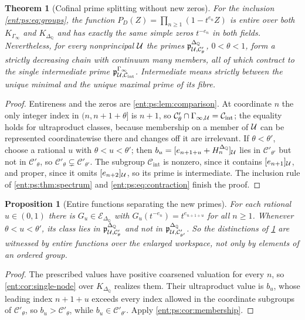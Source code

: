 \documentclass[11pt]{article}
\newtheorem{theorem}{Theorem}[section]
\theoremstyle{plain}
\theoremstyle{plain}
\newtheorem{proposition}[proposition]{Proposition}
\theoremstyle{plain}
\theoremstyle{definition}
\theoremstyle{definition}
\theoremstyle{definition}
\theoremstyle{definition}
\theoremstyle{remark}
\newcommand{\Q}{\mathbb Q}\newcommand{\Z}{\mathbb Z}\newcommand{\N}{\mathbb N}
\begin{document}
\begin{theorem}[Cofinal prime splitting without new zeros]
\label{ent:ps:thm:splitting}
For the inclusion \eqref{ent:ps:eq:groups}, the function
$P_D(Z)=\prod_{n\ge1}(1-t^{e_n}Z)$ is entire over both $K_{\Gamma_\infty}$
and $K_{\Delta_\Q}$ and has exactly the same simple zeros $t^{-e_n}$ in both
fields. Nevertheless, for every nonprincipal $\mathcal U$ the primes
$\mathfrak p^{\Delta_\Q}_{\Ucal,\mathcal C'_\theta}$, $0<\theta<1$, form a
strictly decreasing chain with continuum many members, all of which contract
to the single intermediate prime
$\mathfrak p^{\Gamma_\infty}_{\mathcal U,\mathcal C_{\mathrm{int}}}$.
Intermediate means strictly between the unique minimal and the unique maximal
prime of its fibre.
\end{theorem}
\begin{proof}
Entireness and the zeros are \cref{ent:ps:lem:comparison}. At coordinate $n$
the only integer index in $(n,n+1+\theta]$ is $n+1$, so
$\mathcal C'_\theta\cap\Gamma_{\infty,\mathcal U}=\mathcal C_{\mathrm{int}}$; the
equality holds for ultraproduct classes, because membership on a member of
$\mathcal U$ can be represented coordinatewise there and changes off it are
irrelevant. If $\theta<\theta'$, choose a rational $u$ with
$\theta<u<\theta'$; then $b_u=[e_{n+1+u}+H_n^{\Delta_\Q}]_\Ucal$ lies in
$\mathcal C'_{\theta'}$ but not in $\mathcal C'_\theta$, so
$\mathcal C'_\theta\subsetneq\mathcal C'_{\theta'}$. The subgroup
$\mathcal C_{\mathrm{int}}$ is nonzero, since it contains
$[e_{n+1}]_\mathcal U$, and proper, since it omits $[e_{n+2}]_\mathcal U$, so its prime
is intermediate. The inclusion rule of \cref{ent:ps:thm:spectrum} and
\eqref{ent:ps:eq:contraction} finish the proof.
\end{proof}

\begin{proposition}[Entire functions separating the new primes]
\label{ent:ps:prop:splitting-witness}
For each rational $u\in(0,1)$ there is $G_u\in\mathcal E_{\Delta_\Q}$ with
$G_u(t^{-e_n})=t^{e_{n+1+u}}$ for all $n\ge1$. Whenever $\theta<u<\theta'$,
its class lies in $\mathfrak p^{\Delta_\Q}_{\Ucal,\mathcal C'_\theta}$ and not
in $\mathfrak p^{\Delta_\Q}_{\Ucal,\mathcal C'_{\theta'}}$. So the
distinctions of \cref{ent:ps:thm:splitting} are witnessed by entire functions
over the enlarged workspace, not only by elements of an ordered group.
\end{proposition}
\begin{proof}
The prescribed values have positive coarsened valuation for every $n$, so
\cref{ent:cor:single-node} over $K_{\Delta_\Q}$ realizes them. Their
ultraproduct value is $b_u$, whose leading index $n+1+u$ exceeds every index
allowed in the coordinate subgroups of $\mathcal C'_\theta$, so
$b_u>\mathcal C'_\theta$, while $b_u\in\mathcal C'_{\theta'}$. Apply
\cref{ent:ps:cor:membership}.
\end{proof}
\end{document}
